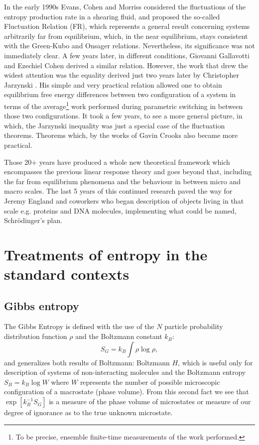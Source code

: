 \documentclass[a4paper,12pt]{article}
\begin{document}
In the early 1990s Evans, Cohen and Morriss \cite{Evans:1993bl} considered the fluctuations of the entropy production rate in a shearing fluid, and proposed the so-called Fluctuation Relation (FR), which represents a general result concerning systems arbitrarily far from equilibrium, which, in the near equilibrium, stays consistent with the Green-Kubo and Onsager relations. Nevertheless, its significance was not immediately clear.
A few years later, in different conditions, Giovanni Gallavotti and Ezechiel Cohen \cite{Gallavotti:1995gy} derived a similar relation. However, the work that drew the widest attention was the equality derived just two years later by Christopher Jarzynski \cite{Jarzynski:1997uj}. 
His simple and very practical relation allowed one to obtain equilibrium free energy differences between two configuration of a system in terms of the average\footnote{To be precise, ensemble finite-time measurements of the work performed.} work performed during parametric switching in between those two configurations.
It took a few years, to see a more general picture, in which, the Jarzynski inequality was just a special case of the fluctuation theorems. Theorems which, by the works of Gavin Crooks \cite{Crooks:2008ta} also became more practical. 

Those 20+ years have produced a whole new theoretical framework which encompasses the previous linear response theory and goes beyond that, including the far from equilibrium phenomena and the behaviour in between micro and macro scales. 
The last 5 years of this continued research paved the way for Jeremy England and coworkers \cite{England:2015hl, England:2010fb} who began description of objects living in that scale e.g. proteins and DNA molecules, implementing what could be named, Schrödinger's plan. 

\section{Treatments of entropy in the standard contexts}

\subsection{Gibbs entropy}
\label{Gibbs entropy}
The Gibbs Entropy is defined with the use of the $N$ particle probability distribution function $ \rho $ and the Boltzmann constant $k_B$:
\begin{equation}
  S_G = k_B \int \rho \log{\rho},
\end{equation}
and generalizes both results of Boltzmann:
Boltzmann $H$, which is useful only for description of systems of non-interacting molecules \cite{Jaynes:1965gg} and the Boltzmann entropy $S_B = k_B \log{W}$ where $W$ represents the number of possible microscopic configuration of a macrostate (phase volume). 
From this second fact we see that $\exp[k_B^{-1} S_G]$ is a measure of the phase volume of microstates or measure of our degree of ignorance as to the true unknown microstate.
\end{document}
